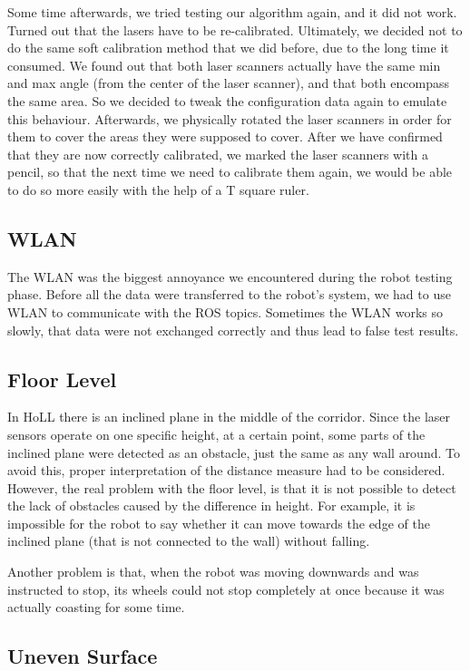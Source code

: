Some time afterwards, we tried testing our algorithm again, and it did not work. Turned out that the lasers have to be re-calibrated. Ultimately, we decided not to do the same soft calibration method that we did before, due to the long time it consumed. We found out that both laser scanners actually have the same min and max angle (from the center of the laser scanner), and that both encompass the same area. So we decided to tweak the configuration data again to emulate this behaviour. Afterwards, we physically rotated the laser scanners in order for them to cover the areas they were supposed to cover. After we have confirmed that they are now correctly calibrated, we marked the laser scanners with a pencil, so that the next time we need to calibrate them again, we would be able to do so more easily with the help of a T square ruler. 

\subsection{WLAN}

The WLAN was the biggest annoyance we encountered during the robot testing phase. Before all the data were transferred to the robot's system, we had to use WLAN to communicate with the ROS topics. Sometimes the WLAN works so slowly, that data were not exchanged correctly and thus lead to false test results.

\subsection{Floor Level}

In HoLL there is an inclined plane in the middle of the corridor. Since the laser sensors operate on one specific height, at a certain point, some parts of the inclined plane were detected as an obstacle, just the same as any wall around. To avoid this, proper interpretation of the distance measure had to be considered. However, the real problem with the floor level, is that it is not possible to detect the lack of obstacles caused by the difference in height. For example, it is impossible for the robot to say whether it can move towards the edge of the inclined plane (that is not connected to the wall) without falling.

Another problem is that, when the robot was moving downwards and was instructed to stop, its wheels could not stop completely at once because it was actually coasting for some time.

\subsection{Uneven Surface}

